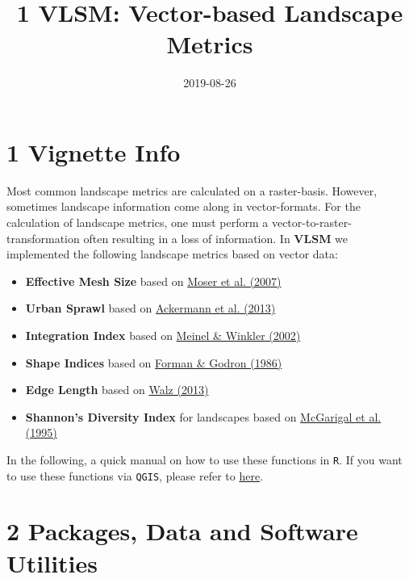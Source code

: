 \documentclass[]{article}
\title{1 VLSM: Vector-based Landscape Metrics}
\author{}
\date{2019-08-26}
\providecommand{\tightlist}{%
  \setlength{\itemsep}{0pt}\setlength{\parskip}{0pt}}
\begin{document}
\maketitle

\section{1 Vignette Info}\label{vignette-info}

Most common landscape metrics are calculated on a raster-basis. However,
sometimes landscape information come along in vector-formats. For the
calculation of landscape metrics, one must perform a
vector-to-raster-transformation often resulting in a loss of
information. In \textbf{VLSM} we implemented the following landscape
metrics based on vector data:

\begin{itemize}
\tightlist
\item
  \textbf{Effective Mesh Size} based on
  \href{https://doi.org/10.1007/s10980-006-9023-0}{Moser et al. (2007)}
\item
  \textbf{Urban Sprawl} based on
  \href{https://www.schulthess.com/buchshop/detail/ISBN-9783784340326/Ackermann-Werne-Schweiger-Manue-Sukopp-Ulrich-fuer-Naturschutz-BfN-Bundesam-Editor/Indikatoren-zur-biologischen-Vielfalt?bpmbutton211549=1\&bpmtoken=}{Ackermann
  et al. (2013)}
\item
  \textbf{Integration Index} based on
  \href{https://www2.ioer.de/recherche/pdf/2002_meinel_earsel.pdf}{Meinel
  \& Winkler (2002)}
\item
  \textbf{Shape Indices} based on
  \href{https://link.springer.com/journal/10980}{Forman \& Godron
  (1986)}
\item
  \textbf{Edge Length} based on
  \href{http://rosdok.uni-rostock.de/file/rosdok_disshab_0000000980/rosdok_derivate_0000005089/Habilitationsschrift_Walz_2013.pdf}{Walz
  (2013)}
\item
  \textbf{Shannon's Diversity Index} for landscapes based on
  \href{https://www.fs.usda.gov/treesearch/pubs/3064}{McGarigal et al.
  (1995)}
\end{itemize}

In the following, a quick manual on how to use these functions in
\texttt{R}. If you want to use these functions via \texttt{QGIS}, please
refer to \href{}{here}.

\section{2 Packages, Data and Software
Utilities}\label{packages-data-and-software-utilities}
\end{document}
